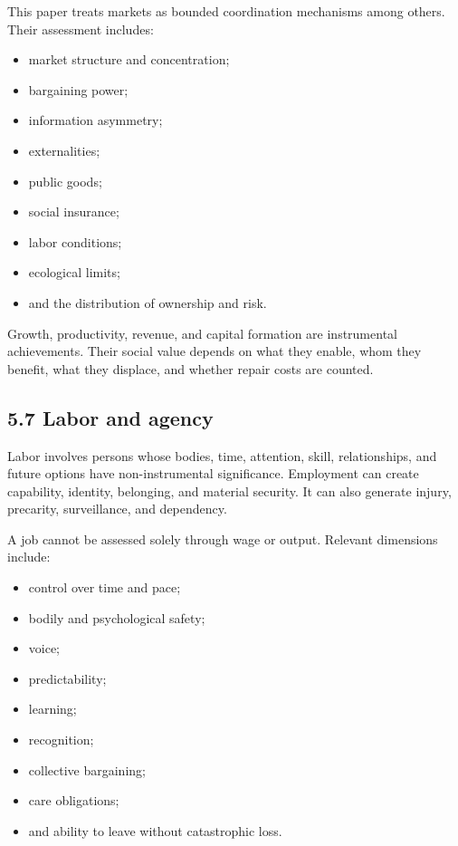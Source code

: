 \documentclass[
  11pt,
]{article}
\providecommand{\tightlist}{%
  \setlength{\itemsep}{0pt}\setlength{\parskip}{0pt}}
\begin{document}
This paper treats markets as bounded coordination mechanisms among
others. Their assessment includes:

\begin{itemize}
\tightlist
\item
  market structure and concentration;
\item
  bargaining power;
\item
  information asymmetry;
\item
  externalities;
\item
  public goods;
\item
  social insurance;
\item
  labor conditions;
\item
  ecological limits;
\item
  and the distribution of ownership and risk.
\end{itemize}

Growth, productivity, revenue, and capital formation are instrumental
achievements. Their social value depends on what they enable, whom they
benefit, what they displace, and whether repair costs are counted.

\subsection{5.7 Labor and agency}\label{labor-and-agency}

Labor involves persons whose bodies, time, attention, skill,
relationships, and future options have non-instrumental significance.
Employment can create capability, identity, belonging, and material
security. It can also generate injury, precarity, surveillance, and
dependency.

A job cannot be assessed solely through wage or output. Relevant
dimensions include:

\begin{itemize}
\tightlist
\item
  control over time and pace;
\item
  bodily and psychological safety;
\item
  voice;
\item
  predictability;
\item
  learning;
\item
  recognition;
\item
  collective bargaining;
\item
  care obligations;
\item
  and ability to leave without catastrophic loss.
\end{itemize}
\end{document}
